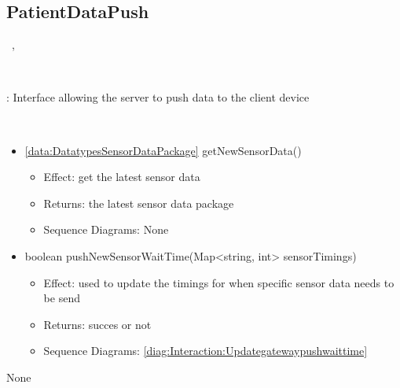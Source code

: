   \subsection{PatientDataPush}\label{int:InterfacesPatientDataPush}
    \begin{description}
      \item[Provided by:] \iconcomponent{}~, \iconcomponent{}~
      \item[Required by:] \iconcomponent{}~ 
           \item[Description]: Interface allowing the server to push data to the client device
      \item[Operations:] ~
    \begin{itemize}[noitemsep,nolistsep,leftmargin=-.25cm]
      \item \textsf{\ref{data:DatatypesSensorDataPackage} getNewSensorData()}
        \begin{itemize}[noitemsep,nolistsep]
           \item Effect: get the latest sensor data 
           \item Returns: the latest sensor data package
           \item Sequence Diagrams: None
        \end{itemize}
      \item \textsf{boolean pushNewSensorWaitTime(Map\textless{}string, int\textgreater{} sensorTimings)}
        \begin{itemize}[noitemsep,nolistsep]
           \item Effect: used to update the timings for when specific sensor data needs to be send 
           \item Returns: succes or not
           \item Sequence Diagrams: \cref{diag:Interaction:Updategatewaypushwaittime}
        \end{itemize}
    \end{itemize}
      \item[Diagrams:] None
    \end{description}

